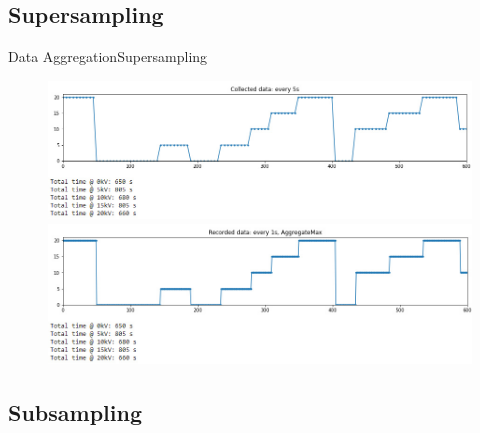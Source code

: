 \documentclass[t, 9pt, aspectratio=169]{beamer}
\begin{document}
    \subsection{Supersampling}

    \begin{frame}{Data Aggregation}{Supersampling}
        \vspace{-1cm}
        \begin{figure}
            \hspace*{-1cm}\includegraphics[scale=0.5]{collected-data-5s.jpg}
            \hspace*{-1cm}\includegraphics[scale=0.5]{aggregate-max-1s.jpg}
        \end{figure}
    \end{frame}

    \subsection{Subsampling}
\end{document}
